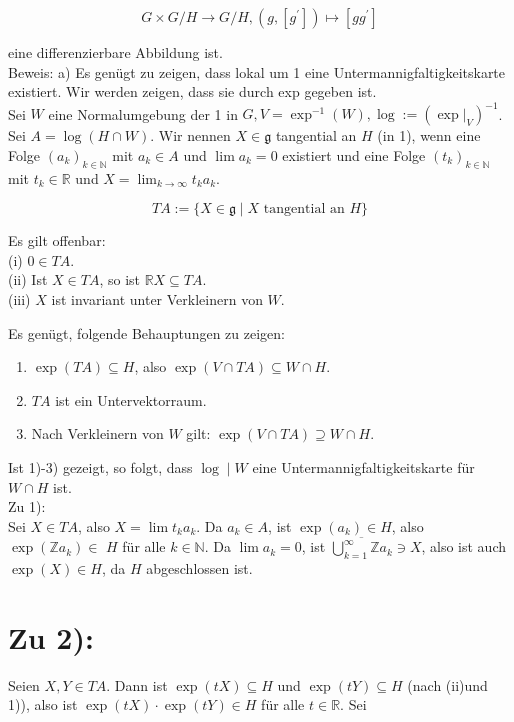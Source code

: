 \documentclass[10pt, letterpaper]{article}
\begin{document}
$$
G \times G / H \rightarrow G / H,\left(g,\left[g^{\prime}\right]\right) \mapsto\left[g g^{\prime}\right]
$$

eine differenzierbare Abbildung ist.\\
Beweis: a) Es genügt zu zeigen, dass lokal um 1 eine Untermannigfaltigkeitskarte existiert. Wir werden zeigen, dass sie durch exp gegeben ist.\\
Sei $W$ eine Normalumgebung der 1 in $G, V=\exp ^{-1}(W), \log :=\left(\left.\exp \right|_{V}\right)^{-1}$. Sei $A=\log (H \cap W)$. Wir nennen $X \in \mathfrak{g}$ tangential an $H$ (in 1), wenn eine Folge $\left(a_{k}\right)_{k \in \mathbb{N}}$ mit $a_{k} \in A$ und $\lim a_{k}=0$ existiert und eine Folge $\left(t_{k}\right)_{k \in \mathbb{N}}$ mit $t_{k} \in \mathbb{R}$ und $X=\lim _{k \rightarrow \infty} t_{k} a_{k}$.

$$
T A:=\{X \in \mathfrak{g} \mid X \text { tangential an } H\}
$$

Es gilt offenbar:\\
(i) $0 \in T A$.\\
(ii) Ist $X \in T A$, so ist $\mathbb{R} X \subseteq T A$.\\
(iii) $X$ ist invariant unter Verkleinern von $W$.

Es genügt, folgende Behauptungen zu zeigen:

\begin{enumerate}
  \item $\exp (T A) \subseteq H$, also $\exp (V \cap T A) \subseteq W \cap H$.
  \item $T A$ ist ein Untervektorraum.
  \item Nach Verkleinern von $W$ gilt: $\exp (V \cap T A) \supseteq W \cap H$.
\end{enumerate}

Ist 1)-3) gezeigt, so folgt, dass $\log \mid W$ eine Untermannigfaltigkeitskarte für $W \cap H$ ist.\\
Zu 1):\\
Sei $X \in T A$, also $X=\lim t_{k} a_{k}$. Da $a_{k} \in A$, ist $\exp \left(a_{k}\right) \in H$, also $\exp \left(\mathbb{Z} a_{k}\right) \in$ $H$ für alle $k \in \mathbb{N}$. Da $\lim a_{k}=0$, ist $\overline{\bigcup_{k=1}^{\infty} \mathbb{Z} a_{k}} \ni X$, also ist auch $\exp (X) \in H$, da $H$ abgeschlossen ist.

\section*{Zu 2):}
Seien $X, Y \in T A$. Dann ist $\exp (t X) \subseteq H$ und $\exp (t Y) \subseteq H$ (nach (ii)und 1)), also ist $\exp (t X) \cdot \exp (t Y) \in H$ für alle $t \in \mathbb{R}$. Sei
\end{document}
